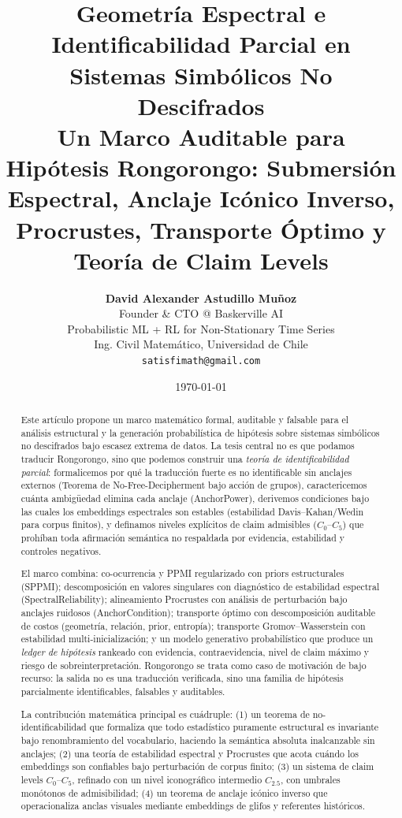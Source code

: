 \documentclass[11pt,a4paper]{article}
\title{
\Large\textbf{Geometría Espectral e Identificabilidad Parcial en Sistemas Simbólicos No Descifrados}\\[0.35em]
\large Un Marco Auditable para Hipótesis Rongorongo: Submersión Espectral, Anclaje Icónico Inverso, Procrustes, Transporte Óptimo y Teoría de Claim Levels
}
\author{
\textbf{David Alexander Astudillo Muñoz}\\[0.3em]
Founder \& CTO @ Baskerville AI\\
Probabilistic ML + RL for Non-Stationary Time Series\\
Ing. Civil Matemático, Universidad de Chile\\[0.3em]
\texttt{satisfimath@gmail.com}
}
\date{\today}
\newcommand{\1}{\mathbf{1}}
\numberwithin{equation}{section}
\begin{document}
\maketitle

\begin{abstract}
Este artículo propone un marco matemático formal, auditable y falsable para el análisis estructural y la generación probabilística de hipótesis sobre sistemas simbólicos no descifrados bajo escasez extrema de datos. La tesis central no es que podamos traducir Rongorongo, sino que podemos construir una \emph{teoría de identificabilidad parcial}: formalicemos por qué la traducción fuerte es no identificable sin anclajes externos (Teorema de No-Free-Decipherment bajo acción de grupos), caractericemos cuánta ambigüedad elimina cada anclaje (AnchorPower), derivemos condiciones bajo las cuales los embeddings espectrales son estables (estabilidad Davis--Kahan/Wedin para corpus finitos), y definamos niveles explícitos de claim admisibles ($C_0$--$C_5$) que prohíban toda afirmación semántica no respaldada por evidencia, estabilidad y controles negativos.

El marco combina: co-ocurrencia y PPMI regularizado con priors estructurales (SPPMI); descomposición en valores singulares con diagnóstico de estabilidad espectral (SpectralReliability); alineamiento Procrustes con análisis de perturbación bajo anclajes ruidosos (AnchorCondition); transporte óptimo con descomposición auditable de costos (geometría, relación, prior, entropía); transporte Gromov--Wasserstein con estabilidad multi-inicialización; y un modelo generativo probabilístico que produce un \emph{ledger de hipótesis} rankeado con evidencia, contraevidencia, nivel de claim máximo y riesgo de sobreinterpretación. Rongorongo se trata como caso de motivación de bajo recurso: la salida no es una traducción verificada, sino una familia de hipótesis parcialmente identificables, falsables y auditables.

La contribución matemática principal es cuádruple: (1) un teorema de no-identificabilidad que formaliza que todo estadístico puramente estructural es invariante bajo renombramiento del vocabulario, haciendo la semántica absoluta inalcanzable sin anclajes; (2) una teoría de estabilidad espectral y Procrustes que acota cuándo los embeddings son confiables bajo perturbación de corpus finito; (3) un sistema de claim levels $C_0$--$C_5$, refinado con un nivel iconográfico intermedio $C_{2.5}$, con umbrales monótonos de admisibilidad; (4) un teorema de anclaje icónico inverso que operacionaliza anclas visuales mediante embeddings de glifos y referentes históricos.


\end{abstract}
\end{document}
